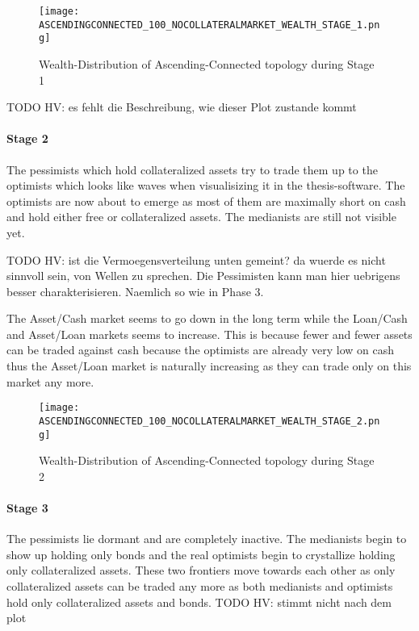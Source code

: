 \documentclass[Bachelorarbeit.tex]{subfiles}
\begin{document}
\begin{figure}[H]
	\centering
  \texttt{[image: ASCENDINGCONNECTED\_100\_NOCOLLATERALMARKET\_WEALTH\_STAGE\_1.png]}
  	\caption{Wealth-Distribution of Ascending-Connected topology during Stage 1}
	\label{fig:markets_ASCENDINGCONNECTED_100_NOCOLLATERALMARKET_WEALTH_STAGE_1}
\end{figure}

TODO HV: es fehlt die Beschreibung, wie dieser Plot zustande kommt

\paragraph{Stage 2}
The pessimists which hold collateralized assets try to trade them up to the optimists which looks like waves when visualisizing it in the thesis-software. The optimists are now about to emerge as most of them are maximally short on cash and hold either free or collateralized assets. The medianists are still not visible yet.

TODO HV: ist die Vermoegensverteilung unten gemeint? da wuerde es nicht sinnvoll sein, von Wellen zu sprechen. Die Pessimisten kann man hier uebrigens besser charakterisieren. Naemlich so wie in Phase 3.

\medskip
		
The Asset/Cash market seems to go down in the long term while the Loan/Cash and Asset/Loan markets seems to increase. This is because fewer and fewer assets can be traded against cash because the optimists are already very low on cash thus the Asset/Loan market is naturally increasing as they can trade only on this market any more.
		
\begin{figure}[H]
	\centering
  \texttt{[image: ASCENDINGCONNECTED\_100\_NOCOLLATERALMARKET\_WEALTH\_STAGE\_2.png]}
  	\caption{Wealth-Distribution of Ascending-Connected topology during Stage 2}
	\label{fig:markets_ASCENDINGCONNECTED_100_NOCOLLATERALMARKET_WEALTH_STAGE_2}
\end{figure}
		
\paragraph{Stage 3}
The pessimists lie dormant and are completely inactive. The medianists begin to show up holding only bonds and the real optimists begin to crystallize holding only collateralized assets. These two frontiers move towards each other as only collateralized assets can be traded any more as both medianists and optimists hold only collateralized assets and bonds. TODO HV: stimmt nicht nach dem plot
\end{document}
